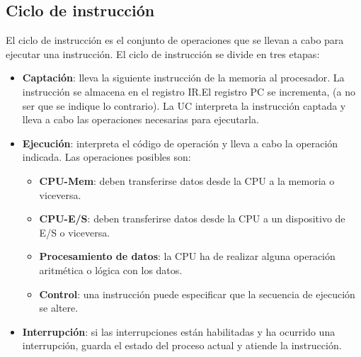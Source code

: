 \subsection{Ciclo de instrucción}

El ciclo de instrucción es el conjunto de operaciones que se llevan a cabo para ejecutar una instrucción. El ciclo de instrucción se divide en tres etapas:

\begin{itemize}
  \item \textbf{Captación}: lleva la siguiente instrucción de la memoria al procesador. La instrucción se almacena en el registro IR.\@ El registro PC se incrementa, (a no ser que se indique lo contrario). La UC interpreta la instrucción captada y lleva a cabo las operaciones necesarias para ejecutarla.
  \item \textbf{Ejecución}: interpreta el código de operación y lleva a cabo la operación indicada. Las operaciones posibles son:
  \begin{itemize}
    \item \textbf{CPU-Mem}: deben transferirse datos desde la CPU a la memoria o viceversa.
    \item \textbf{CPU-E/S}: deben transferirse datos desde la CPU a un dispositivo de E/S o viceversa.
    \item \textbf{Procesamiento de datos}: la CPU ha de realizar alguna operación aritmética o lógica con los datos.
    \item \textbf{Control}: una instrucción puede especificar que la secuencia de ejecución se altere.
  \end{itemize}
  \item \textbf{Interrupción}: si las interrupciones están habilitadas y ha ocurrido una interrupción, guarda el estado del proceso actual y atiende la instrucción.
\end{itemize}